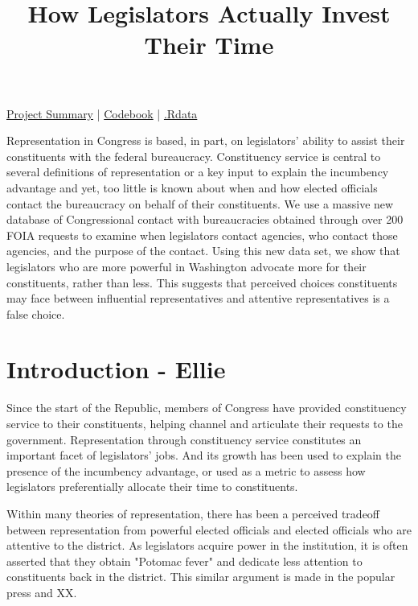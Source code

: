 \documentclass[]{article}
\title{How Legislators Actually Invest Their Time}
\author{}
\date{}
\begin{document}
\maketitle
\tableofcontents

\bigskip
\href{https://judgelord.github.io/correspondence/gh-pages/summary.html}{Project Summary} | 
\href{https://docs.google.com/document/d/1fJxjXjAyRL9vX-16fSsH29anXZc-W74GMf_7BSgWkws/edit}{Codebook} |
\href{https://drive.google.com/drive/u/0/folders/1DSGGZP_v2zwdfxg9Do3Ii4Y8UdXultVg}{.Rdata}
\bigskip


Representation in Congress is based, in part, on legislators' ability to assist their constituents with the federal bureaucracy.  Constituency service is central to several definitions of representation or a key input to explain the incumbency advantage and yet, too little is known about when and how elected officials contact the bureaucracy on behalf of their constituents. We use a massive new database of Congressional contact with bureaucracies obtained through over 200 FOIA requests to examine when legislators contact agencies, who contact those agencies, and the purpose of the contact. Using this new data set, we show that legislators who are more powerful in Washington advocate more for their constituents, rather than less.  This suggests that perceived choices constituents may face between influential representatives and attentive representatives is a false choice.  


\section{Introduction - Ellie}

Since the start of the Republic, members of Congress have provided constituency service to their constituents, helping channel and articulate their requests to the government. Representation through constituency service constitutes an important facet of legislators' jobs.  And its growth has been used to explain the presence of the incumbency advantage, or used as a metric to assess how legislators preferentially allocate their time to constituents.  

Within many theories of representation, there has been a perceived tradeoff between representation from powerful elected officials and elected officials who are attentive to the district.  As legislators acquire power in the institution, it is often asserted that they obtain "Potomac fever" and dedicate less attention to constituents back in the district.  This similar argument is made in the popular press and XX.
\end{document}
